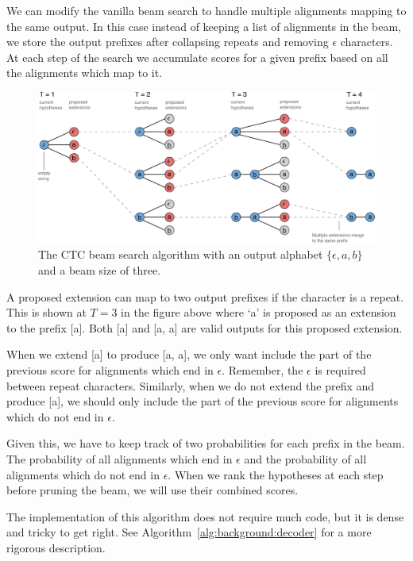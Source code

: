 We can modify the vanilla beam search to handle multiple alignments mapping to
the same output. In this case instead of keeping a list of alignments in the
beam, we store the output prefixes after collapsing repeats and removing
$\epsilon$ characters. At each step of the search we accumulate scores for a
given prefix based on all the alignments which map to it.

\begin{figure}
\centering
\includegraphics[width=\textwidth]{background/figures/prefix_beam_search.pdf}
\caption{The CTC beam search algorithm with an output alphabet $\{\epsilon, a,
    b\}$ and a beam size of three.}
\end{figure}

A proposed extension can map to two output prefixes if the character is a
repeat. This is shown at $T=3$ in the figure above where `a’ is proposed as an
extension to the prefix [a]. Both [a] and [a, a] are valid outputs for this
proposed extension.

When we extend [a] to produce [a, a], we only want include the part of the
previous score for alignments which end in $\epsilon$. Remember, the $\epsilon$
is required between repeat characters. Similarly, when we do not extend the
prefix and produce [a], we should only include the part of the previous score
for alignments which do not end in $\epsilon$.

Given this, we have to keep track of two probabilities for each prefix in the
beam. The probability of all alignments which end in $\epsilon$ and the
probability of all alignments which do not end in $\epsilon$. When we rank the
hypotheses at each step before pruning the beam, we will use their combined
scores.

The implementation of this algorithm does not require much code, but it is
dense and tricky to get right. See Algorithm~\ref{alg:background:decoder} for a
more rigorous description.

